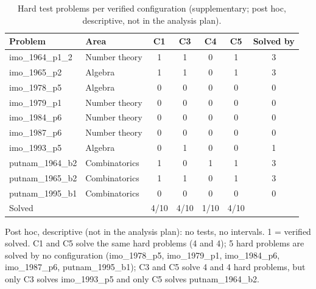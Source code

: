 \begin{table}[t]
\centering
\footnotesize
\setlength{\tabcolsep}{3pt}
\caption{Hard test problems per verified configuration (supplementary; post hoc, descriptive, not in the analysis plan).}
\label{tab:hard}
\begin{tabular}{llccccc}
\toprule
Problem & Area & C1 & C3 & C4 & C5 & Solved by \\
\midrule
imo\_1964\_p1\_2 & Number theory & 1 & 1 & 0 & 1 & 3 \\
imo\_1965\_p2 & Algebra & 1 & 1 & 0 & 1 & 3 \\
imo\_1978\_p5 & Algebra & 0 & 0 & 0 & 0 & 0 \\
imo\_1979\_p1 & Number theory & 0 & 0 & 0 & 0 & 0 \\
imo\_1984\_p6 & Number theory & 0 & 0 & 0 & 0 & 0 \\
imo\_1987\_p6 & Number theory & 0 & 0 & 0 & 0 & 0 \\
imo\_1993\_p5 & Algebra & 0 & 1 & 0 & 0 & 1 \\
putnam\_1964\_b2 & Combinatorics & 1 & 0 & 1 & 1 & 3 \\
putnam\_1965\_b2 & Combinatorics & 1 & 1 & 0 & 1 & 3 \\
putnam\_1995\_b1 & Combinatorics & 0 & 0 & 0 & 0 & 0 \\
\midrule
Solved &  & 4/10 & 4/10 & 1/10 & 4/10 &  \\
\bottomrule
\end{tabular}

\vspace{2pt}
\parbox{\linewidth}{\scriptsize Post hoc, descriptive (not in the analysis plan): no tests, no intervals. 1 = verified solved. C1 and C5 solve the same hard problems (4 and 4); 5 hard problems are solved by no configuration (imo\_1978\_p5, imo\_1979\_p1, imo\_1984\_p6, imo\_1987\_p6, putnam\_1995\_b1); C3 and C5 solve 4 and 4 hard problems, but only C3 solves imo\_1993\_p5 and only C5 solves putnam\_1964\_b2.}
\end{table}


